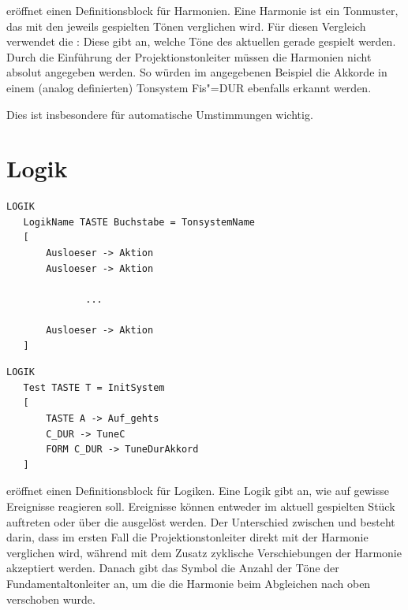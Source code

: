 

 eröffnet einen Definitionsblock für Harmonien. Eine
Harmonie ist ein Tonmuster, das mit den jeweils gespielten Tönen
verglichen wird. Für diesen Vergleich verwendet \mutabor{} die
: Diese gibt an,
welche Töne des aktuellen 
gerade gespielt werden. Durch die Einführung der Projektionstonleiter
müssen die Harmonien nicht absolut angegeben werden. So würden im
angegebenen Beispiel die Akkorde in einem (analog definierten)
Tonsystem Fis"=DUR ebenfalls erkannt werden.


Dies ist insbesondere für automatische Umstimmungen wichtig. 


\section{Logik}
\label{sec:SX_LOGIC}



\begin{verbatim}
LOGIK
   LogikName TASTE Buchstabe = TonsystemName
   [
       Ausloeser -> Aktion
       Ausloeser -> Aktion

              ...

       Ausloeser -> Aktion
   ]
\end{verbatim}




\begin{verbatim}
LOGIK 
   Test TASTE T = InitSystem
   [
       TASTE A -> Auf_gehts
       C_DUR -> TuneC 
       FORM C_DUR -> TuneDurAkkord 
   ]
\end{verbatim}




 eröffnet einen Definitionsblock für Logiken. Eine
Logik gibt an, wie \mutabor{} auf gewisse Ereignisse reagieren soll.
Ereignisse können entweder im aktuell gespielten Stück auftreten oder
über die  ausgelöst werden. Der
Unterschied zwischen  und  besteht
darin, dass im ersten Fall die Projektionstonleiter direkt mit der
Harmonie verglichen wird, während mit dem Zusatz
 zyklische Verschiebungen der
Harmonie akzeptiert werden. Danach gibt das Symbol 
die Anzahl der Töne der Fundamentaltonleiter an, um die die Harmonie
beim Abgleichen nach oben verschoben wurde.


